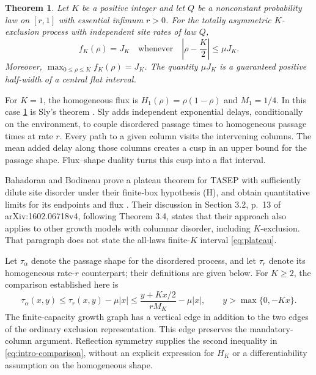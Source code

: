 \documentclass[11pt]{amsart}
\newtheorem{theorem}{Theorem}[section]
\theoremstyle{remark}
\numberwithin{equation}{section}
\begin{document}
\begin{theorem}\label{thm:main}
Let $K$ be a positive integer and let $Q$ be a nonconstant probability law
on $[r,1]$ with essential infimum $r>0$. For the totally asymmetric
$K$-exclusion process with independent site rates of law $Q$,
\begin{equation}\label{eq:plateau}
 f_K(\rho)=J_K
 \quad\text{whenever}\quad
 \left|\rho-\frac K2\right|\leq\mu J_K.
\end{equation}
Moreover, $\max_{0\leq\rho\leq K}f_K(\rho)=J_K$. The quantity $\mu J_K$
is a guaranteed positive half-width of a central flat interval.
\end{theorem}

For $K=1$, the homogeneous flux is $H_1(\rho)=\rho(1-\rho)$ and
$M_1=1/4$. In this case \cref{thm:main} is Sly's theorem
\cite[Theorem 1]{Sly}. Sly adds independent exponential delays, conditionally
on the environment, to couple disordered passage times to homogeneous
passage times at rate $r$. Every path to a given column visits the
intervening columns. The mean added delay along those columns creates a
cusp in an upper bound for the passage shape. Flux--shape duality turns
this cusp into a flat interval.

Bahadoran and Bodineau prove a plateau theorem for TASEP with sufficiently
dilute site disorder under their finite-box hypothesis (H), and obtain
quantitative limits for its endpoints and flux
\cite[Theorems 2.4 and 2.6]{BB}. Their discussion in Section 3.2, p.~13 of
arXiv:1602.06718v4, following Theorem 3.4, states that their approach also
applies to other growth models with columnar disorder, including
$K$-exclusion. That paragraph does not state the all-laws finite-$K$
interval \eqref{eq:plateau}.

Let $\tau_\alpha$ denote the passage shape for the disordered process,
and let $\tau_r$ denote its homogeneous rate-$r$ counterpart; their
definitions are given below. For $K\geq2$, the comparison established here is
\begin{equation}\label{eq:intro-comparison}
 \tau_\alpha(x,y)
 \leq \tau_r(x,y)-\mu|x|
 \leq \frac{y+Kx/2}{rM_K}-\mu|x|,
 \qquad y>\max\{0,-Kx\}.
\end{equation}
The finite-capacity growth graph has a vertical edge in addition to the
two edges of the ordinary exclusion representation. This edge preserves
the mandatory-column argument. Reflection symmetry supplies the second
inequality in \eqref{eq:intro-comparison}, without an explicit expression
for $H_K$ or a differentiability assumption on the homogeneous shape.
\end{document}
